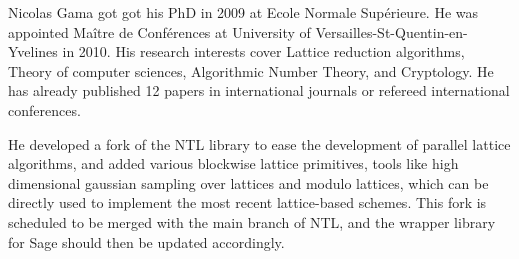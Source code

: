 \begin{participant}{Nicolas Gama}
  got got his PhD in 2009 at Ecole Normale Supérieure. He was appointed Maître de
  Conférences at University of Versailles-St-Quentin-en-Yvelines in 2010.  His research
  interests cover Lattice reduction algorithms, Theory of computer sciences, Algorithmic
  Number Theory, and Cryptology. He has already published 12 papers in international
  journals or refereed international conferences.

  He developed a fork of the NTL library to ease the development of parallel lattice
  algorithms, and added various blockwise lattice primitives, tools like high dimensional
  gaussian sampling over lattices and modulo lattices, which can be directly used to
  implement the most recent lattice-based schemes. This fork is scheduled to be merged
  with the main branch of NTL, and the wrapper library for Sage should then be updated
  accordingly.
\end{participant}
